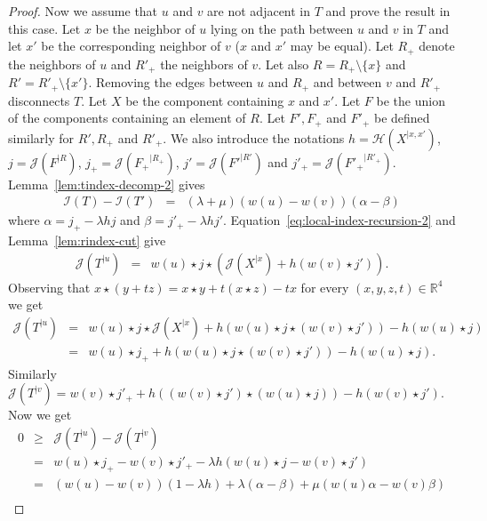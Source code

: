 \documentclass[11 pt]{modarticle}
\newcommand{\cR}{\mathbb{R}}
\newcommand{\wmap}{w}
\newcommand{\rtree}[2]{{#1}^{\lvert #2}}
\newcommand{\ourproduct}{b}
\newcommand{\indexsymbol}{\mathcal{I}}
\newcommand{\tindex}[1]{\indexsymbol(#1)}
\newcommand{\rindexsymbol}{\mathcal{J}}
\newcommand{\rindex}[2]{\rindexsymbol(\rtree{#2}{#1})}
\newcommand{\aindexsymbol}{\mathcal{H}}
\newcommand{\aindex}[3]{\aindexsymbol(\rtree{#3}{#1, #2})}
\begin{document}
\begin{proof}
Now we assume that $u$ and $v$ are not adjacent in $T$ and prove the result in this case. Let $x$ be the neighbor of $u$ lying on the path between $u$ and $v$ in $T$ and let $x'$ be the corresponding neighbor of $v$ ($x$ and $x'$ may be equal). Let $R_+$ denote the neighbors of $u$ and $R'_+$ the neighbors of $v$. Let also $R = R_+ \setminus \{x\}$ and $R'= R'_+ \setminus \{x'\}$. Removing the edges between $u$ and $R_+$ and between $v$ and $R'_+$ disconnects $T$. Let $X$ be the component containing $x$ and $x'$. Let $F$ be the union of the components containing an element of $R$. Let $F', F_+$ and $F'_+$ be defined similarly for $R', R_+$ and $R'_+$. We also introduce the notations $h = \aindex{x}{x'}{X}$, $j = \rindex{R}{F}$, $j_+ = \rindex{R_+}{F_+}$, $j' = \rindex{R'}{F'}$ and $j'_+ = \rindex{R'_+}{F'_+}$. Lemma~\ref{lem:tindex-decomp-2} gives
\begin{eqnarray}
	\tindex{T} - \tindex{T'} & = & (\lambda + \mu)(\wmap(u) - \wmap(v))(\alpha - \beta) \label{eq:compacity-map-proof-eq3}
\end{eqnarray}
where $\alpha = j_+ - \lambda h j$ and $\beta = j'_+ - \lambda h j'$. Equation~\eqref{eq:local-index-recursion-2} and Lemma~\ref{lem:rindex-cut} give
\begin{eqnarray*}
	\rindex{u}{T} & = & \wmap(u)\star j \star (\rindex{x}{X} + h (\wmap(v) \star j')).
\end{eqnarray*}
Observing that $x \star (y + tz) = x \star y + t (x \star z) - tx$ for every $(x,y,z,t) \in \cR^4$ we get
\begin{eqnarray*}
	\rindex{u}{T} & = & \wmap(u)\star j \star \rindex{x}{X} + h (\wmap(u)\star j \star (\wmap(v) \star j')) - h (\wmap(u) \star j) \\
	& = & \wmap(u) \star j_+ + h (\wmap(u)\star j \star (\wmap(v) \star j')) - h (\wmap(u) \star j).
\end{eqnarray*}
Similarly $\rindex{v}{T} = \wmap(v) \star  j'_+ + h \left((\wmap(v) \star j')\star (\wmap(u) \star j)\right) - h (\wmap(v) \star j')$. Now %
we get
\begin{eqnarray}
	0 & \geq & \rindex{u}{T} - \rindex{v}{T} \nonumber \\
	& = & \wmap(u) \star  j_+ - \wmap(v) \star j'_+ - \lambda h (\wmap(u) \star j - \wmap(v) \star j') \nonumber \\
	& = & (\wmap(u) - \wmap(v))(1 - \lambda h) + \lambda(\alpha - \beta) + \mu (\wmap(u)\alpha - \wmap(v) \beta) \nonumber \\

\end{eqnarray}
\end{proof}
\end{document}
